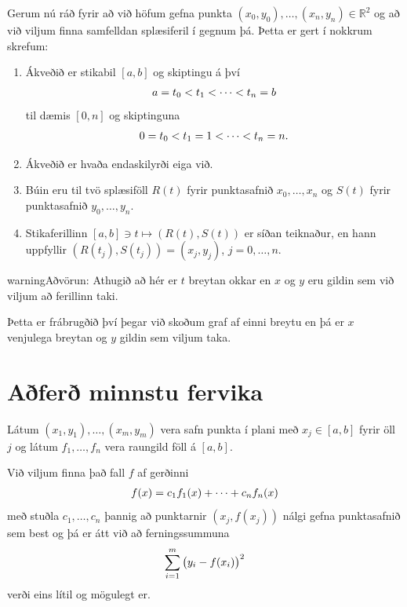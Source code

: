\documentclass[A4paper,10pt,icelandic]{sphinxmanual}
\begin{document}
Gerum nú ráð fyrir að við höfum gefna punkta \((x_0,y_0),\dots,(x_n,y_n) \in \mathbb R^2\)
og að við viljum finna samfelldan splæsiferil í gegnum þá. Þetta er gert
í nokkrum skrefum:
\begin{enumerate}
\item {} 
Ákveðið er stikabil \([a,b]\) og skiptingu á því
\begin{gather}
\begin{split}a=t_0<t_1<\cdots<t_n=b\end{split}\notag
\end{gather}
til dæmis \([0,n]\) og skiptinguna
\begin{gather}
\begin{split}0=t_0<t_1=1<\cdots<t_n=n.\end{split}\notag
\end{gather}
\item {} 
Ákveðið er hvaða endaskilyrði eiga við.

\item {} 
Búin eru til tvö splæsiföll \(R(t)\) fyrir punktasafnið
\(x_0,\dots,x_n\) og \(S(t)\) fyrir punktasafnið
\(y_0,\dots,y_n\).

\item {} 
Stikaferillinn \([a,b]\ni t\mapsto (R(t),S(t))\) er síðan teiknaður, en hann uppfyllir
\((R(t_j),S(t_j))=(x_j,y_j)\), \(j=0,\dots,n\).

\end{enumerate}

\begin{notice}{warning}{Aðvörun:}
Athugið að hér er \(t\) breytan okkar en \(x\) og \(y\) eru gildin sem við
viljum að ferillinn taki.

Þetta er frábrugðið því þegar við skoðum graf af einni breytu en þá er
\(x\) venjulega breytan og \(y\) gildin sem viljum taka.
\end{notice}


\section{Aðferð minnstu fervika}
\label{kafli03:index-23}\label{kafli03:afer-minnstu-fervika}
Látum \((x_1,y_1),\dots,(x_m,y_m)\) vera safn punkta í plani með
\(x_j\in
[a,b]\) fyrir öll \(j\) og látum \(f_1,\dots,f_n\) vera raungild
föll á \([a,b]\).

Við viljum finna það fall \(f\) af gerðinni
\begin{gather}
\begin{split}f(x)=c_1f_1(x) + \cdots + c_nf_n(x)\end{split}\notag
\end{gather}
með stuðla \(c_1, \ldots, c_n\) þannig að punktarnir
\((x_j,f(x_j))\) nálgi gefna punktasafnið sem best og þá er átt við
að ferningssummuna
\begin{gather}
\begin{split}\sum_{i=1}^m\big(y_i-f(x_i)\big)^2\end{split}\notag
\end{gather}
verði eins lítil og mögulegt er.
\end{document}

